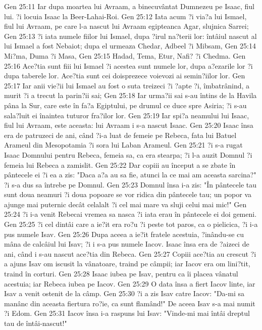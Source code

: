 Gen 25:11  Iar dupa moartea lui Avraam, a binecuvântat Dumnezeu pe Isaac, fiul lui. ?i locuia Isaac la Beer-Lahai-Roi.
Gen 25:12  Iata acum ?i via?a lui Ismael, fiul lui Avraam, pe care l-a nascut lui Avraam egipteanca Agar, slujnica Sarrei;
Gen 25:13  ?i iata numele fiilor lui Ismael, dupa ?irul na?terii lor: întâiul nascut al lui Ismael a fost Nebaiot; dupa el urmeaza Chedar, Adbeel ?i Mibsam,
Gen 25:14  Mi?ma, Duma ?i Masa,
Gen 25:15  Hadad, Tema, Etur, Nafi? ?i Chedma.
Gen 25:16  Ace?tia sunt fiii lui Ismael ?i acestea sunt numele lor, dupa a?ezarile lor ?i dupa taberele lor. Ace?tia sunt cei doisprezece voievozi ai semin?iilor lor.
Gen 25:17  Iar anii vie?ii lui Ismael au fost o suta treizeci ?i ?apte ?i, îmbatrânind, a murit ?i a trecut la parin?ii sai;
Gen 25:18  Iar urma?ii sai s-au întins de la Havila pâna la Sur, care este în fa?a Egiptului, pe drumul ce duce spre Asiria; ?i s-au sala?luit ei înaintea tuturor fra?ilor lor.
Gen 25:19  Iar spi?a neamului lui Isaac, fiul lui Avraam, este aceasta: lui Avraam i s-a nascut Isaac.
Gen 25:20  Isaac însa era de patruzeci de ani, când ?i-a luat de femeie pe Rebeca, fata lui Batuel Arameul din Mesopotamia ?i sora lui Laban Arameul.
Gen 25:21  ?i s-a rugat Isaac Domnului pentru Rebeca, femeia sa, ca era stearpa; ?i l-a auzit Domnul ?i femeia lui Rebeca a zamislit.
Gen 25:22  Dar copiii au început a se zbate în pântecele ei ?i ea a zis: "Daca a?a au sa fie, atunci la ce mai am aceasta sarcina?" ?i s-a dus sa întrebe pe Domnul.
Gen 25:23  Domnul însa i-a zis: "În pântecele tau sunt doua neamuri ?i doua popoare se vor ridica din pântecele tau; un popor va ajunge mai puternic decât celalalt ?i cel mai mare va sluji celui mai mic!"
Gen 25:24  ?i i-a venit Rebecai vremea sa nasca ?i iata erau în pântecele ei doi gemeni.
Gen 25:25  ?i cel dintâi care a ie?it era ro?u ?i peste tot paros, ca o pielicica, ?i i-a pus numele Isav.
Gen 25:26  Dupa aceea a ie?it fratele acestuia, ?inându-se cu mâna de calcâiul lui Isav; ?i i s-a pus numele Iacov. Isaac însa era de ?aizeci de ani, când i s-au nascut ace?tia din Rebeca.
Gen 25:27  Copiii ace?tia au crescut ?i a ajuns Isav om iscusit la vânatoare, traind pe câmpii; iar Iacov era om lini?tit, traind în corturi.
Gen 25:28  Isaac iubea pe Isav, pentru ca îi placea vânatul acestuia; iar Rebeca iubea pe Iacov.
Gen 25:29  O data însa a fiert Iacov linte, iar Isav a venit ostenit de la câmp.
Gen 25:30  ?i a zis Isav catre Iacov: "Da-mi sa manânc din aceasta fiertura ro?ie, ca sunt flamând!" De aceea Isav s-a mai numit ?i Edom.
Gen 25:31  Iacov însa i-a raspuns lui Isav: "Vinde-mi mai întâi dreptul tau de întâi-nascut!"
